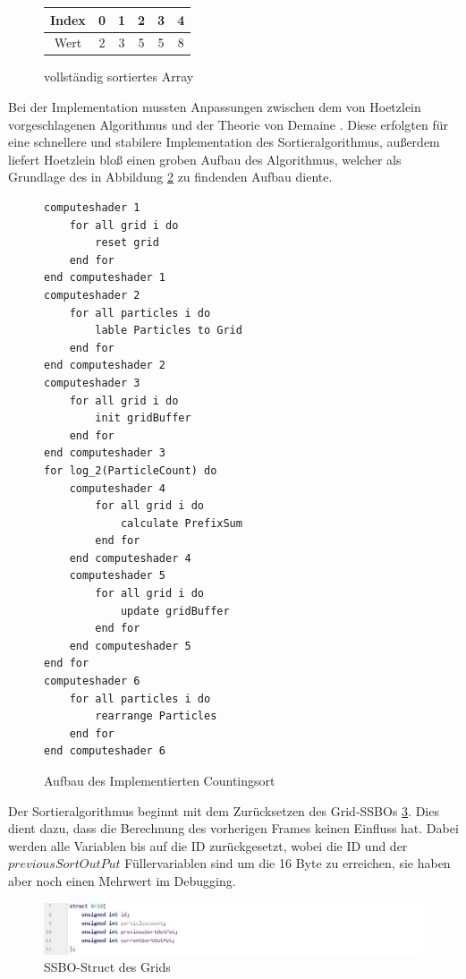 \documentclass[intern,palatino]{cgBA}
\begin{document}
\begin{figure}[H]
	\centering
	\begin{tabular}{ | c || c | c | c | c | c |}
		\hline
		Index 				&  0 & 1 & 2 & 3 & 4 \\ \hline
		Wert				&  2 & 3 & 5 & 5 & 8 \\
		\hline
	\end{tabular}
	\caption{vollständig sortiertes Array}
	\label{tab:Counting4}
\end{figure}


Bei der Implementation mussten Anpassungen zwischen dem von Hoetzlein \cite{nvidia} vorgeschlagenen Algorithmus und der Theorie von Demaine \cite{counting}. Diese erfolgten für eine schnellere und stabilere Implementation des Sortieralgorithmus, außerdem liefert Hoetzlein bloß einen groben Aufbau des Algorithmus, welcher als Grundlage des in Abbildung \ref{code:Counting} zu findenden Aufbau diente.
\newline

\begin{figure}[H]
	\centering
	\begin{lstlisting}
computeshader 1
	for all grid i do
		reset grid
	end for
end computeshader 1
computeshader 2
	for all particles i do
		lable Particles to Grid
	end for
end computeshader 2
computeshader 3
	for all grid i do
		init gridBuffer
	end for
end computeshader 3
for log_2(ParticleCount) do
	computeshader 4
		for all grid i do
			calculate PrefixSum
		end for
	end computeshader 4
	computeshader 5
		for all grid i do
			update gridBuffer
		end for
	end computeshader 5
end for
computeshader 6
	for all particles i do
		rearrange Particles
	end for
end computeshader 6
	\end{lstlisting}
	\caption{Aufbau des Implementierten Countingsort}
	\label{code:Counting}
\end{figure}

Der Sortieralgorithmus beginnt mit dem Zurücksetzen des Grid-SSBOs \ref{img:GridStruct}. Dies dient dazu, dass die  Berechnung des vorherigen Frames keinen Einfluss hat. Dabei werden alle Variablen bis auf die ID zurückgesetzt, wobei die ID und der $previousSortOutPut$ Füllervariablen sind um die 16 Byte zu erreichen, sie haben aber noch einen Mehrwert im Debugging.

\begin{figure}[H]
	\centering
	\includegraphics[width=1.3\columnwidth]{Bilder/GridStruct.jpg}
	\caption{SSBO-Struct des Grids}
	\label{img:GridStruct}
\end{figure}
\end{document}
